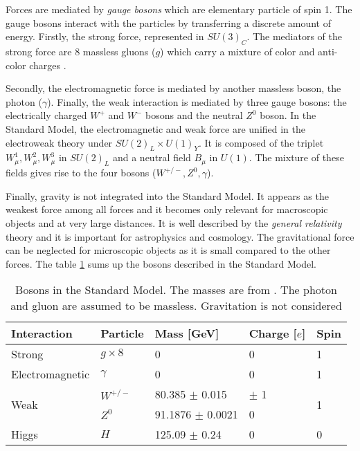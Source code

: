 Forces are mediated by \textit{gauge bosons} which are elementary particle of spin 1. The gauge bosons interact with the particles by transferring a discrete amount of energy. Firstly, the strong force, represented in $SU(3)_{C}$. The mediators of the strong force are 8 massless gluons ($g$) which carry a mixture of color and anti-color charges \cite{Griffiths:343277}.

Secondly, the electromagnetic force is mediated by another massless boson, the photon ($\gamma$). Finally, the weak interaction is mediated by three gauge bosons: the electrically charged $W^+$ and $W^-$ bosons and the neutral $Z^0$ boson. In the Standard Model, the electromagnetic and weak force are unified in the electroweak theory under $SU(2)_{L} \times U(1)_{Y}$. It is composed of the triplet $W_{\mu}^1, W_{\mu}^2, W_{\mu}^3$ in $SU(2)_{L}$ and a neutral field $B_{\mu}$ in $U(1)$. The mixture of these fields gives rise to the four bosons ($W^{+/-}, Z^0, \gamma$).

Finally, gravity is not integrated into the Standard Model. It appears as the weakest force among all forces and it becomes only relevant for macroscopic objects and at very large distances. It is well described by the \textit{general relativity} theory \cite{Einstein:1905ve} and it is important for astrophysics and cosmology. The gravitational force can be neglected for microscopic objects as it is small compared to the other forces. The table \ref{table:Bosons} sums up the bosons described in the Standard Model.

\begin{table}[htb!]
  \centering
  \caption{Bosons in the Standard Model. The masses are from \cite{Patrignani:2016xqp}. The photon and gluon are assumed to be massless. Gravitation is not considered}
  \label{table:Bosons}
  \begin{tabular}{@{}lllll@{}} \toprule
    Interaction & Particle & Mass [GeV] & Charge [$e$] & Spin\\
    \midrule
    Strong & $g \times 8$ & 0 & 0 & 1\\
    Electromagnetic & $\gamma$ & 0 & 0 & 1\\
    \multirow{2}{*}{Weak} & $W^{+/-}$ & 80.385 $\pm$ 0.015 & $\pm$ 1 & \multirow{2}{*}{1}\\
    & $Z^0$ & 91.1876 $\pm$ 0.0021 & 0 &\\
    Higgs & $H$ & 125.09 $\pm$ 0.24 & 0 & 0\\
    \bottomrule
  \end{tabular}
\end{table}

